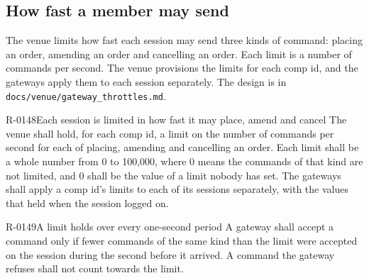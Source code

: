 \subsection{How fast a member may send}
\label{subsec:gateway_throttles}

The venue limits how fast each session may send three kinds of command: placing an order,
amending an order and cancelling an order. Each limit is a number of commands per second.
The venue provisions the limits for each comp id, and the gateways apply them to each
session separately. The design is in \texttt{docs/venue/gateway\_throttles.md}.

\begin{requirement}{R-0148}{Each session is limited in how fast it may place, amend and cancel}
  The venue shall hold, for each comp id, a limit on the number of commands per second for
  each of placing, amending and cancelling an order. Each limit shall be a whole number from
  0 to 100,000, where 0 means the commands of that kind are not limited, and 0 shall be the
  value of a limit nobody has set. The gateways shall apply a comp id's limits to each of its
  sessions separately, with the values that held when the session logged on.
\end{requirement}

\begin{requirement}{R-0149}{A limit holds over every one-second period}
  A gateway shall accept a command only if fewer commands of the same kind than the limit
  were accepted on the session during the second before it arrived. A command the gateway
  refuses shall not count towards the limit.
\end{requirement}

